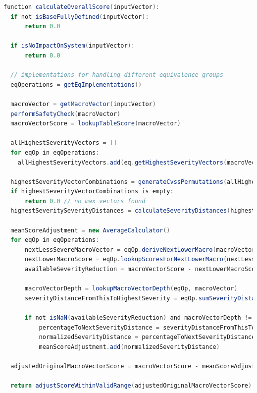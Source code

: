 \begin{lstlisting}[language=Java, label={lst:cvss-typescript-cvss-4P0-calculateOverallScore-pseudocode}, caption={CVSS 4.0 Score-Berechnung Pseudocode}]
function calculateOverallScore(inputVector):
  if not isBaseFullyDefined(inputVector):
      return 0.0

  if isNoImpactOnSystem(inputVector):
      return 0.0

  // implementations for handling different equivalence groups
  eqOperations = getEqImplementations()

  macroVector = getMacroVector(inputVector)
  performSafetyCheck(macroVector)
  macroVectorScore = lookupTableScore(macroVector)

  allHighestSeverityVectors = []
  for eqOp in eqOperations:
    allHighestSeverityVectors.add(eq.getHighestSeverityVectors(macroVector))

  highestSeverityVectorCombinations = generateCvssPermutations(allHighestSeverityVectors)
  if highestSeverityVectorCombinations is empty:
      return 0.0 // no max vectors found
  highestSeveritySeverityDistances = calculateSeverityDistances(highestSeverityVectorCombinations)

  meanScoreAdjustment = new AverageCalculator()
  for eqOp in eqOperations:
      nextLessSevereMacroVector = eqOp.deriveNextLowerMacro(macroVector)
      nextLowerMacroScore = eqOp.lookupScoresForNextLowerMacro(nextLessSevereMacroVector)
      availableSeverityReduction = macroVectorScore - nextLowerMacroScore

      macroVectorDepth = lookupMacroVectorDepth(eqOp, macroVector)
      severityDistanceFromThisToHighestSeverity = eqOp.sumSeverityDistances(highestSeveritySeverityDistances)

      if not isNaN(availableSeverityReduction) and macroVectorDepth != 0.0:
          percentageToNextSeverityDistance = severityDistanceFromThisToHighestSeverity / macroVectorDepth
          normalizedSeverityDistance = percentageToNextSeverityDistance * availableSeverityReduction
          meanScoreAdjustment.add(normalizedSeverityDistance)

  adjustedOriginalMacroVectorScore = macroVectorScore - meanScoreAdjustment.average()

  return adjustScoreWithinValidRange(adjustedOriginalMacroVectorScore)
\end{lstlisting}
